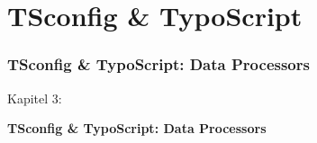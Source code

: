 %

\section{TSconfig \& TypoScript}
\begin{frame}[fragile]
	\frametitle{TSconfig \& TypoScript: Data Processors}

	\begin{center}\huge{Kapitel 3:}\end{center}
	\begin{center}\huge{\color{typo3darkgrey}\textbf{TSconfig \& TypoScript: Data Processors}}\end{center}

\end{frame}


